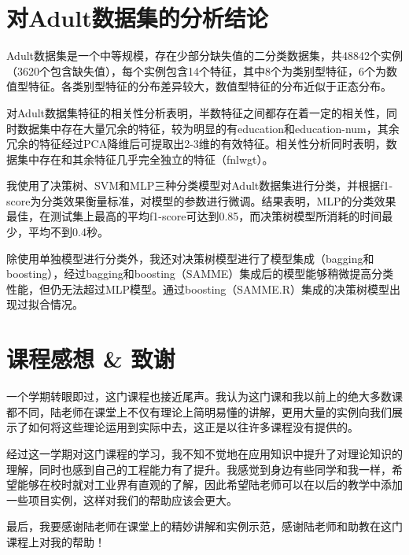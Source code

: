 \documentclass[12pt,a4paper]{article}
\theoremstyle{definition}
\begin{document}
\section{对Adult数据集的分析结论}

Adult数据集是一个中等规模，存在少部分缺失值的二分类数据集，共48842个实例（3620个包含缺失值），每个实例包含14个特征，其中8个为类别型特征，6个为数值型特征。各类别型特征的分布差异较大，数值型特征的分布近似于正态分布。

\vspace{0.01\linewidth}
对Adult数据集特征的相关性分析表明，半数特征之间都存在着一定的相关性，同时数据集中存在大量冗余的特征，较为明显的有education和education-num，其余冗余的特征经过PCA降维后可提取出2-3维的有效特征。相关性分析同时表明，数据集中存在和其余特征几乎完全独立的特征（fnlwgt）。

\vspace{0.01\linewidth}
我使用了决策树、SVM和MLP三种分类模型对Adult数据集进行分类，并根据f1-score为分类效果衡量标准，对模型的参数进行微调。结果表明，MLP的分类效果最佳，在测试集上最高的平均f1-score可达到0.85，而决策树模型所消耗的时间最少，平均不到0.4秒。

\vspace{0.01\linewidth}
除使用单独模型进行分类外，我还对决策树模型进行了模型集成（bagging和boosting），经过bagging和boosting（SAMME）集成后的模型能够稍微提高分类性能，但仍无法超过MLP模型。通过boosting（SAMME.R）集成的决策树模型出现过拟合情况。

\section{课程感想 \& 致谢}

一个学期转眼即过，这门课程也接近尾声。我认为这门课和我以前上的绝大多数课都不同，陆老师在课堂上不仅有理论上简明易懂的讲解，更用大量的实例向我们展示了如何将这些理论运用到实际中去，这正是以往许多课程没有提供的。

\vspace{0.01\linewidth}
经过这一学期对这门课程的学习，我不知不觉地在应用知识中提升了对理论知识的理解，同时也感到自己的工程能力有了提升。我感觉到身边有些同学和我一样，希望能够在校时就对工业界有直观的了解，因此希望陆老师可以在以后的教学中添加一些项目实例，这样对我们的帮助应该会更大。

\vspace{0.01\linewidth}
最后，我要感谢陆老师在课堂上的精妙讲解和实例示范，感谢陆老师和助教在这门课程上对我的帮助！
\end{document}
